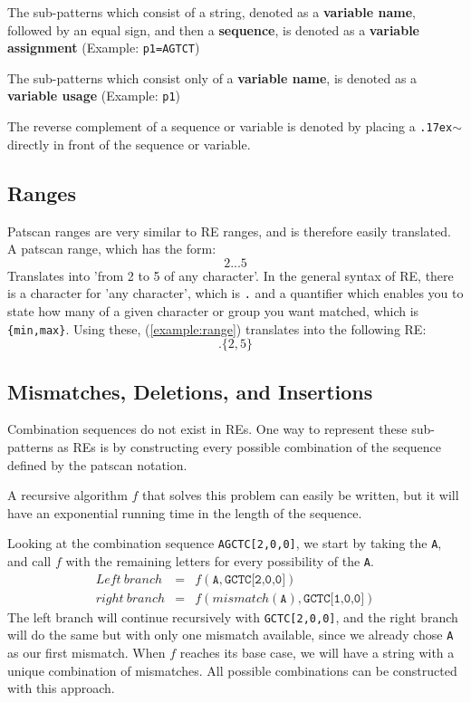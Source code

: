\documentclass[12pt]{article}
\theoremstyle{definition}
\begin{document}
The sub-patterns which consist of a string, denoted as a \textbf{variable name}, followed by an equal sign, and then a \textbf{sequence}, is denoted as a \textbf{variable assignment} (Example: \texttt{p1=AGTCT})

The sub-patterns which consist only of a \textbf{variable name}, is denoted as a \textbf{variable usage} (Example: \texttt{p1})

The reverse complement of a sequence or variable is denoted by placing a \texttt{{\raise.17ex\hbox{$\scriptstyle\mathtt{\sim}$}}} directly in front of the sequence or variable.

\subsection{Ranges}

Patscan ranges are very similar to RE ranges, and is therefore easily translated. A patscan range, which has the form:
\begin{equation}
\label{example:range}
	2...5
\end{equation}
Translates into 'from 2 to 5 of any character'. In the general syntax of RE, there is a character for 'any character', which is \texttt{.} and a quantifier which enables you to state how many of a given character or group you want matched, which is \texttt{\{min,max\}}. Using these, (\ref{example:range}) translates into the following RE:
\begin{equation}
.\{2,5\}
\end{equation}

\subsection{Mismatches, Deletions, and Insertions}

Combination sequences do not exist in REs. One way to represent these sub-patterns as REs is by constructing every possible combination of the sequence defined by the patscan notation.

A recursive algorithm $f$ that solves this problem can easily be written, but it will have an exponential running time in the length of the sequence. 

\begin{example}[label=example:recursion]
Looking at the combination sequence \texttt{AGCTC[2,0,0]}, we start by taking the \texttt{A}, and call $f$ with the remaining letters for every possibility of the \texttt{A}.
\begin{eqnarray}
	Left\ branch &=& f(\texttt{A}, \texttt{GCTC[2,0,0]}) \\
	right\ branch &=& f(mismatch(\texttt{A}), \texttt{GCTC[1,0,0]})
\end{eqnarray}
The left branch will continue recursively with \texttt{GCTC[2,0,0]}, and the right branch will do the same but with only one mismatch available, since we already chose \texttt{A} as our first mismatch. When $f$ reaches its base case, we will have a string with a unique combination of mismatches. All possible combinations can be constructed with this approach.
\end{example}
\end{document}
